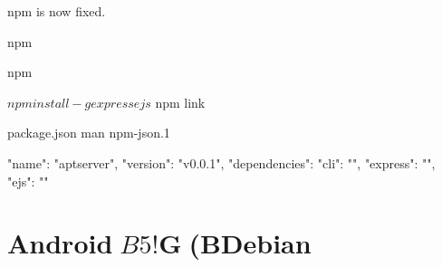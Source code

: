 {\begin{frame}{npm}
 is now fixed.
\end{frame}

\begin{frame}[containsverbatim]{npm}
\end{frame}

\begin{frame}[containsverbatim]{npm}
 \begin{commandline}
$ npm install -g express ejs
$ npm link
 \end{commandline}
\end{frame}

\begin{frame}[containsverbatim]{package.json}
 man npm-json.1\\
\begin{commandline}
{
    "name": "aptserver",
    "version": "v0.0.1",
    "dependencies": {
	"cli": "",
	"express": "",
	"ejs": ""
    }
} 
\end{commandline}
\end{frame}

\section{Android$B5!$G(BDebian}



\begin{frame}{$B$H$3$m$G$_$J$5$s%

\center{$B$H$3$m$G$_$J$5$s%

\end{frame}


}
